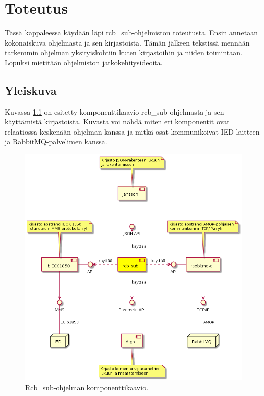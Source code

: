 \chapter{Toteutus}
\label{ch:toteutus}
Tässä kappaleessa käydään läpi rcb\_sub-ohjelmiston toteutusta. Ensin annetaan kokonaiskuva ohjelmasta ja sen kirjastoista. Tämän jälkeen tekstissä mennään tarkemmin ohjelman yksityiskohtiin kuten kirjastoihin ja niiden toimintaan. Lopuksi mietitään ohjelmiston jatkokehitysideoita.


\section{Yleiskuva}
\label{ch:rcb-sub-yleiskuva}
Kuvassa \ref{fig:rcb-sub-komponenttikaavio} on esitetty komponenttikaavio rcb\_sub-ohjelmasta ja sen käyttämistä kirjastoista. Kuvasta voi nähdä miten eri komponentit ovat relaatiossa keskenään ohjelman kanssa ja mitkä osat kommunikoivat IED-laitteen ja RabbitMQ-palvelimen kanssa.

\begin{figure}[ht!]
	\includegraphics[width=1\textwidth]{pictures/rcb-sub-component-diagram.png}
	\caption{Rcb\_sub-ohjelman komponenttikaavio.}
	\label{fig:rcb-sub-komponenttikaavio}
\end{figure}

